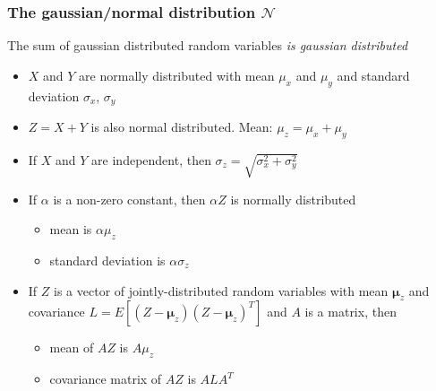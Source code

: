 \begin{frame}
	\frametitle{The gaussian/normal distribution $\mathcal{N}$}
	The sum of gaussian distributed random variables \emph{is gaussian distributed}
	\begin{itemize}
		\item $X$ and $Y$ are normally distributed with mean $\mu_x$ and $\mu_y$ and standard deviation $\sigma_x$, $\sigma_y$
		\item $Z=X+Y$ is also normal distributed. Mean: $\mu_z=\mu_x+\mu_y$
		\item <2-> If $X$ and $Y$ are independent, then $\sigma_z=\sqrt{\sigma_x^2 + \sigma_y^2}$
		\item <3-> If $\alpha$ is a non-zero constant, then $\alpha Z$ is normally distributed
		\begin{itemize}
			\item mean is $\alpha \mu_z$
			\item standard deviation is $\alpha \sigma_z$
		\end{itemize}
	
		\item <4-> If $Z$ is a vector of jointly-distributed random variables with mean $\bm{\mu}_z$ and covariance $L=E[(Z-\bm{\mu}_z)(Z-\bm{\mu}_z)^T]$
		and $A$ is a matrix, then
		\begin{itemize}
			\item mean of $AZ$ is $A \mu_z$
			\item covariance matrix of $AZ$ is $ALA^T$
		\end{itemize}
	\end{itemize} 
\end{frame}
